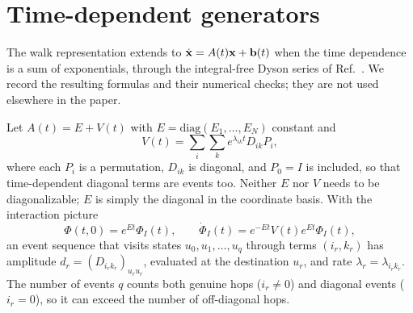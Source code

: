 \section{Time-dependent generators}\label{app:td}

The walk representation extends to $\dot{{\bf x}}=A(t){\bf x}+{\bf b}(t)$ when the time dependence is a sum of exponentials, through the integral-free Dyson series of Ref.~\cite{kalev2021}. We record the resulting formulas and their numerical checks; they are not used elsewhere in the paper.

Let $A(t)=E+V(t)$ with $E=\mathrm{diag}(E_1,\dots,E_N)$ constant and
\begin{equation}
V(t)=\sum_{i}\sum_{k}e^{\lambda_{ik}t}D_{ik}P_i ,
\end{equation}
where each $P_i$ is a permutation, $D_{ik}$ is diagonal, and $P_0=I$ is included, so that time-dependent diagonal terms are events too. Neither $E$ nor $V$ needs to be diagonalizable; $E$ is simply the diagonal in the coordinate basis. With the interaction picture
\begin{equation}
\Phi(t,0)=e^{Et}\Phi_I(t),\qquad \dot\Phi_I(t)=e^{-Et}V(t)e^{Et}\Phi_I(t),
\end{equation}
an event sequence that visits states $u_0,u_1,\dots,u_q$ through terms $(i_r,k_r)$ has amplitude $d_r=(D_{i_rk_r})_{u_ru_r}$, evaluated at the destination $u_r$, and rate $\lambda_r=\lambda_{i_rk_r}$. The number of events $q$ counts both genuine hops ($i_r\neq0$) and diagonal events ($i_r=0$), so it can exceed the number of off-diagonal hops.

